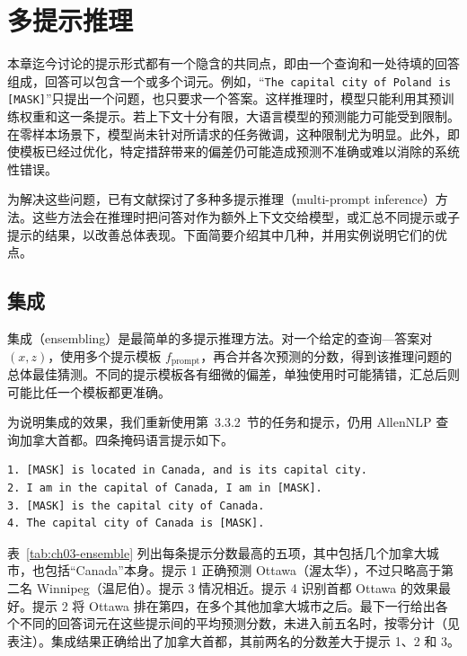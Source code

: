\section{多提示推理}
\label{sec:ch03-multi}
本章迄今讨论的提示形式都有一个隐含的共同点，即由一个查询和一处待填的回答组成，回答可以包含一个或多个词元。例如，“\texttt{The capital city of Poland is [MASK]}”只提出一个问题，也只要求一个答案。这样推理时，模型只能利用其预训练权重和这一条提示。若上下文十分有限，大语言模型的预测能力可能受到限制。在零样本场景下，模型尚未针对所请求的任务微调，这种限制尤为明显。此外，即使模板已经过优化，特定措辞带来的偏差仍可能造成预测不准确或难以消除的系统性错误。

为解决这些问题，已有文献探讨了多种多提示推理（multi-prompt inference）方法。这些方法会在推理时把问答对作为额外上下文交给模型，或汇总不同提示或子提示的结果，以改善总体表现。下面简要介绍其中几种，并用实例说明它们的优点。

\subsection{集成}
集成（ensembling）是最简单的多提示推理方法。对一个给定的查询—答案对 $(x,z)$，使用多个提示模板 $f_{\mathrm{prompt}}$，再合并各次预测的分数，得到该推理问题的总体最佳猜测。不同的提示模板各有细微的偏差，单独使用时可能猜错，汇总后则可能比任一个模板都更准确。

为说明集成的效果，我们重新使用第~3.3.2~节的任务和提示，仍用 AllenNLP 查询加拿大首都。四条掩码语言提示如下。
\begin{lstlisting}[caption={查询加拿大首都的提示},label={lst:ch03-canada}]
1. [MASK] is located in Canada, and is its capital city.
2. I am in the capital of Canada, I am in [MASK].
3. [MASK] is the capital city of Canada.
4. The capital city of Canada is [MASK].
\end{lstlisting}

表~\ref{tab:ch03-ensemble} 列出每条提示分数最高的五项，其中包括几个加拿大城市，也包括“Canada”本身。提示 1 正确预测 Ottawa（渥太华），不过只略高于第二名 Winnipeg（温尼伯）。提示 3 情况相近。提示 4 识别首都 Ottawa 的效果最好。提示 2 将 Ottawa 排在第四，在多个其他加拿大城市之后。最下一行给出各个不同的回答词元在这些提示间的平均预测分数，未进入前五名时，按零分计（见表注）。集成结果正确给出了加拿大首都，其前两名的分数差大于提示 1、2 和 3。

